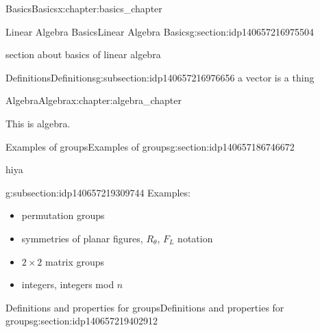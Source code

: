 \documentclass[oneside,10pt,]{book}
\numberwithin{equation}{section}
\begin{document}
\begin{chapterptx}{Basics}{}{Basics}{}{}{x:chapter:basics_chapter}
\begin{sectionptx}{Linear Algebra Basics}{}{Linear Algebra Basics}{}{}{g:section:idp140657216975504}
\begin{introduction}{}%
section about basics of linear algebra\end{introduction}%
%
%
\typeout{************************************************}
\typeout{************************************************}
%
\begin{subsectionptx}{Definitions}{}{Definitions}{}{}{g:subsection:idp140657216976656}
a vector is a thing%
\end{subsectionptx}
\end{sectionptx}
\end{chapterptx}
%
%
\typeout{************************************************}
\typeout{************************************************}
%
\begin{chapterptx}{Algebra}{}{Algebra}{}{}{x:chapter:algebra_chapter}
\begin{introduction}{}%
This is algebra.\end{introduction}%
%
%
\typeout{************************************************}
\typeout{************************************************}
%
\begin{sectionptx}{Examples of groups}{}{Examples of groups}{}{}{g:section:idp140657186746672}
\begin{introduction}{}%
hiya\end{introduction}%
%
%
\typeout{************************************************}
\typeout{************************************************}
%
\begin{subsectionptx}{}{}{}{}{}{g:subsection:idp140657219309744}
Examples:%
\begin{itemize}[label=\textbullet]
\item{}permutation groups%
\item{}symmetries of planar figures, \(R_\theta\), \(F_L\) notation%
\item{}\(2\times 2\) matrix groups%
\item{}integers, integers mod \(n\)%
\end{itemize}
%
\end{subsectionptx}
\end{sectionptx}
%
%
\typeout{************************************************}
\typeout{************************************************}
%
\begin{sectionptx}{Definitions and properties for groups}{}{Definitions and properties for groups}{}{}{g:section:idp140657219402912}

\end{sectionptx}
\end{chapterptx}
\end{document}
